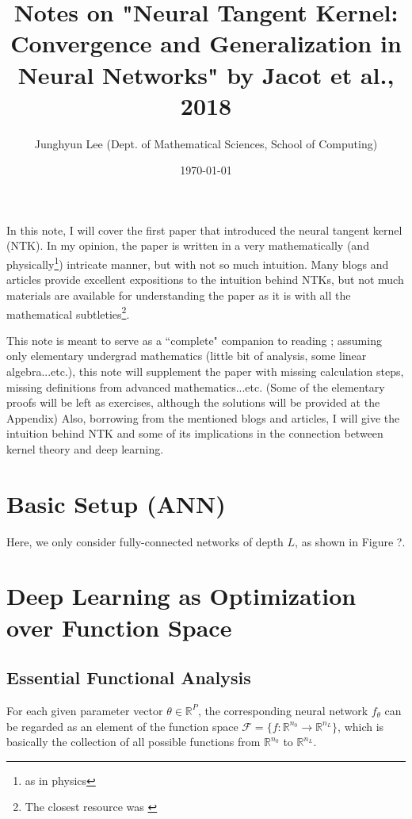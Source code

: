 \documentclass{article}
\theoremstyle{plain}
\theoremstyle{definition}
\theoremstyle{remark}
\begin{document}
\title{%
  \huge Notes on "Neural Tangent Kernel: Convergence and Generalization in Neural Networks" by Jacot et al., 2018
  }
\author{Junghyun Lee (Dept. of Mathematical Sciences, School of Computing)}
\date{\today}
\maketitle

In this note, I will cover the first paper\cite{NTK} that introduced the neural tangent kernel (NTK).
In my opinion, the paper is written in a very mathematically (and physically\footnote{as in physics}) intricate manner, but with not so much intuition.
Many blogs and articles \cite{NTK-Rajat, NTK-CMU, NTK-Huszar, NTK-oxford} provide excellent expositions to the intuition behind NTKs, but not much materials are available for understanding the paper as it is with all the mathematical subtleties\footnote{The closest resource was \cite{NTK-Jinwoo}}.

This note is meant to serve as a ``complete" companion to reading \cite{NTK}; assuming only elementary undergrad mathematics (little bit of analysis, some linear algebra...etc.), this note will supplement the paper with missing calculation steps, missing definitions from advanced mathematics...etc.
(Some of the elementary proofs will be left as exercises, although the solutions will be provided at the Appendix)
Also, borrowing from the mentioned blogs and articles, I will give the intuition behind NTK and some of its implications in the connection between kernel theory and deep learning.



\section{Basic Setup (ANN)}
Here, we only consider fully-connected networks of depth $L$, as shown in Figure ?.


\section{Deep Learning as Optimization over Function Space}
\subsection{Essential Functional Analysis}
For each given parameter vector $\theta \in \mathbb{R}^P$, the corresponding neural network $f_\theta$ can be regarded as an element of the function space $\mathcal{F} = \{f : \mathbb{R}^{n_0} \rightarrow \mathbb{R}^{n_L}\}$, which is basically the collection of all possible functions from $\mathbb{R}^{n_0}$ to $\mathbb{R}^{n_L}$.
\end{document}
